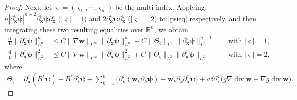 \documentclass[11pt,reqno]{amsart}
\DeclareMathOperator{\diver}{\mathrm{div}}
\numberwithin{rk}{section}
\numberwithin{prop}{section}
\numberwithin{mydef}{section}
\numberwithin{lem}{section}
\numberwithin{equation}{section}
\numberwithin{thm}{section}
\begin{document}
\begin{proof}
Next, let $\boldsymbol{\varsigma}=(\varsigma_1,\cdots\!,\varsigma_n)$ be the multi-index. Applying  $n|\partial_{\boldsymbol{x}}^{\boldsymbol{\varsigma}} \boldsymbol{\psi}|^{n-2}\partial_{\boldsymbol{x}}^{\boldsymbol{\varsigma}} \boldsymbol{\psi}\partial_{\boldsymbol{x}}^{\boldsymbol{\varsigma}}$ ($|\boldsymbol{\varsigma}|=1$) and $2\partial_{\boldsymbol{x}}^{\boldsymbol{\varsigma}} \boldsymbol{\psi}\partial_{\boldsymbol{x}}^{\boldsymbol{\varsigma}}$ ($|\boldsymbol{\varsigma}|=2$) to \eqref{psieq} respectively, and then integrating these two resulting equalities over $\mathbb{R}^n$, we obtain
\begin{equation}\label{2.26}
\begin{aligned}
\frac{\mathrm{d}}{\mathrm{d}t}\|\partial_{\boldsymbol{x}}^{\boldsymbol{\varsigma}}  \boldsymbol{\psi}\|^n_{L^n}
&\leq  C\|\nabla \boldsymbol{w}\|_{L^\infty}\|\partial_{\boldsymbol{x}}^{\boldsymbol{\varsigma}}  \boldsymbol{\psi}\|^n_{L^n}+C\|\Theta_{\boldsymbol{\varsigma}} \|_{L^n}\|\partial_{\boldsymbol{x}}^{\boldsymbol{\varsigma}}  \boldsymbol{\psi}\|^{n-1}_{L^n}&& \ \ \text{with $|\boldsymbol{\varsigma}|=1$},\\
\frac{\mathrm{d}}{\mathrm{d}t}\|\partial_{\boldsymbol{x}}^{\boldsymbol{\varsigma}}  \boldsymbol{\psi}\|^2_{L^2}
&\leq C\|\nabla \boldsymbol{w}\|_{L^\infty}\|\partial_{\boldsymbol{x}}^{\boldsymbol{\varsigma}}  \boldsymbol{\psi}\|^2_{L^2}+C\|\Theta_{\boldsymbol{\varsigma}}\|_{L^2}\|\partial_{\boldsymbol{x}}^{\boldsymbol{\varsigma}}  \boldsymbol{\psi}\|_{L^2}&& \ \ \text{with $|\boldsymbol{\varsigma}|=2$}, 
\end{aligned}
\end{equation}
where
\begin{equation*}
\begin{aligned}
\Theta_{\boldsymbol{\varsigma}}=\partial_{\boldsymbol{x}}^{\boldsymbol{\varsigma}} (B^*\boldsymbol{\psi})-B^*\partial_{\boldsymbol{x}}^{\boldsymbol{\varsigma}}  \boldsymbol{\psi}+\sum_{k=1}^{n}\big(\partial_{\boldsymbol{x}}^{\boldsymbol{\varsigma}} (\boldsymbol{w}_{k} \partial_k \boldsymbol{\psi})-\boldsymbol{w}_{k} \partial_k\partial_{\boldsymbol{x}}^{\boldsymbol{\varsigma}}  \boldsymbol{\psi}\big)+ a\delta \partial_{\boldsymbol{x}}^{\boldsymbol{\varsigma}}\big(g\nabla \diver \boldsymbol{w}+\nabla g \diver \boldsymbol{w}\big).
\end{aligned}
\end{equation*}


\end{proof}
\end{document}
